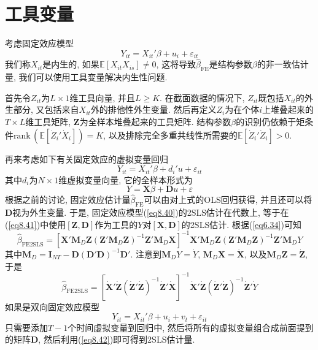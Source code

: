 \documentclass[cn, 12pt, math=mtpro2, bibstyle=apa, blue, twocol]{elegantbook}
\newcommand{\E}{\mathbb{E}}
\newcommand{\X}{\mathbold{X}}
\newcommand{\Z}{\mathbold{Z}}
\newcommand{\hb}{\hat{\beta}}
\newcommand{\M}{\mathbold{M}}
\begin{document}
\section{工具变量}
考虑固定效应模型
\begin{equation}\label{eq8.40}
  Y_{it}=X_{it}'\beta+u_i+\varepsilon_{it}
\end{equation}
我们称$X_{it}$是内生的, 如果$\E[X_{it}X_{is}]\neq0$, 这将导致$\hb_{\text{FE}}$是结构参数$\beta$的非一致估计量, 我们可以使用工具变量解决内生性问题.

首先令$Z_{it}$为$L\times 1$维工具向量, 并且$L\geq K$. 在截面数据的情况下, $Z_{it}$既包括$X_{it}$的外生部分, 又包括来自$X_{it}$外的排他性外生变量. 然后再定义$Z_i$为在个体$i$上堆叠起来的$T\times L$维工具矩阵, $\mathbold{Z}$为全样本堆叠起来的工具矩阵. 结构参数$\beta$的识别仍依赖于矩条件$\text{rank}\,(\E[\dot{Z}_i'\dot{X}_i])=K$, 以及排除完全多重共线性所需要的$\E[\dot{Z}_i'\dot{Z}_i]>0$.

再来考虑如下有关固定效应的虚拟变量回归
$$Y_{it}=X_{it}'\beta+d_i'u+\varepsilon_{it}$$
其中$d_i$为$N\times1$维虚拟变量向量, 它的全样本形式为
\begin{equation}\label{eq8.41}
  Y=\X\beta+\mathbold{D}u+\varepsilon
\end{equation}
根据之前的讨论, 固定效应估计量$\hb_{\text{FE}}$可以由对上式的OLS回归获得, 并且还可以将$\mathbold{D}$视为外生变量. 于是, 固定效应模型(\ref{eq8.40})的2SLS估计在代数上, 等于在(\ref{eq8.41})中使用$[\mathbold{Z},\mathbold{D}]$作为工具的$Y$对$[\X,\mathbold{D}]$的2SLS估计. 根据(\ref{eq6.34})可知
\begin{equation}\label{eq8.42}
  \hb_\text{FE2SLS}=[\X'\M_D\Z(\Z'\M_D\Z)^{-1}\Z'\M_D\X]^{-1}\X'\M_D\Z(\Z'\M_D\Z)^{-1}\Z'\M_DY
\end{equation}
其中$\M_D=\mathbold{I}_{NT}-\mathbold{D}(\mathbold{D}'\mathbold{D})^{-1}\mathbold{D}'$. 注意到$\M_DY=\dot{Y}$, $\M_D\X=\dot{\X}$, 以及$\M_D\Z=\dot{\Z}$, 于是
$$\hb_{\text{FE2SLS}}=[\dot{\X}'\dot{\Z}(\dot{\Z}'\dot{\Z})^{-1}\dot{\Z}'\dot{\X}]^{-1}\dot{\X}'\dot{\Z}(\dot{\Z}'\dot{\Z})^{-1}\dot{\Z}'\dot{Y}$$
如果是双向固定效应模型
$$Y_{it}=X_{it}'\beta+u_i+v_t+\varepsilon_{it}$$
只需要添加$T-1$个时间虚拟变量到回归中, 然后将所有的虚拟变量组合成前面提到的矩阵$\mathbold{D}$, 然后利用(\ref{eq8.42})即可得到2SLS估计量.
\end{document}
